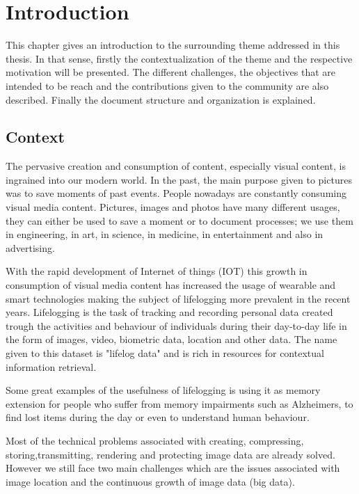 \cleardoublepage

\chapter{Introduction}
This chapter gives an introduction to the surrounding theme addressed in this thesis. In that sense, firstly the contextualization of the theme and the respective motivation will be presented. The different challenges, the objectives that are intended to be reach and the contributions given to the community are also described. Finally the document structure and organization is explained.


\section{Context}
The pervasive creation and consumption of content, especially visual content, is ingrained into our modern world. In the past, the main purpose given to pictures was to save moments of past events. People nowadays are constantly consuming visual media content. Pictures, images and photos have many different usages, they can either be used to save a moment or to document processes; we use them in engineering, in art, in science, in medicine, in entertainment and also in advertising. \cite{Zhang2008}


With the rapid development of Internet of things (IOT) this growth in consumption of visual media content has increased the usage of wearable and smart technologies making the subject of lifelogging more prevalent in the recent years. Lifelogging is the task of tracking and recording personal data created trough the activities and behaviour of individuals during their day-to-day life in the form of images, video, biometric data, location and other data. The name given to this  dataset  is "lifelog data" and is rich in resources for contextual information retrieval. \cite{Ribeiro}

Some great examples of the usefulness of lifelogging is using it as memory extension for people who suffer from memory impairments such as Alzheimers, to find lost items during the day or even to understand human behaviour.



Most of the technical problems associated with creating, compressing, storing,transmitting, rendering and protecting image data are already solved. However we still face two main challenges which are the issues associated with image location and the continuous growth of image data (big data).

